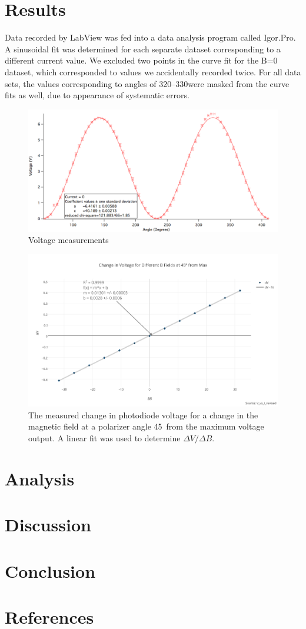 \documentclass[prb,preprint]{revtex4-1}
\begin{document}
\section{Results}
{Data recorded by LabView was fed into a data analysis program called Igor.Pro.  A sinusoidal fit was determined for each separate dataset corresponding to a different current value.  We excluded two points in the curve fit for the B=0 dataset, which corresponded to values we accidentally recorded twice. For all data sets, the values corresponding to angles of 320\degree--330\degree were masked from the curve fits as well, due to appearance of systematic errors. 
\begin{figure}
\includegraphics[width = 6.3in]{0A.pdf}
\caption{\label{nofield}Voltage measurements }

\end{figure}

\begin{figure}[b]
\includegraphics[width =6.3in]{change_in_voltage_for_different_b_fields_at_45_from_max.pdf}
\caption{\label{method2pic} The measured change in photodiode voltage for a change in the magnetic field at a polarizer angle 45\degree\  from the maximum voltage output. A linear fit was used to determine $\Delta V/\Delta B$.}
\end{figure}
}
\section{Analysis}


\section{Discussion}




\section{Conclusion}


\section{References}
\end{document}
